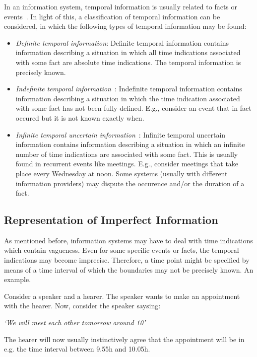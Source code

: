 In an information system, temporal information is usually related to facts or events~\cite{Chountas2000}. In light of this, a classification of temporal information can be considered, in which the following types of temporal information may be found:


\begin{itemize}
\item \emph{Definite temporal information}:
Definite temporal information contains information describing a situation in which all time indications associated with some fact are absolute time indications. The temporal information is precisely known.

\item \emph{Indefinite temporal information}~\cite{Dey1996}:
Indefinite temporal information contains information describing a situation in which the time indication associated with some fact has not been fully defined. E.g., consider an event that in fact occured but it is not known exactly when.

\item \emph{Infinite temporal uncertain information}~\cite{Kabanza1990}:
Infinite temporal uncertain information contains information describing a situation in which an infinite number of time indications are associated with some fact. This is usually found in recurrent events like meetings. E.g., consider meetings that take place every Wednesday at noon. Some systems (usually with different information providers) may dispute the occurence and/or the duration of a fact.
\end{itemize}

\subsection{\label{subsec:representation}Representation of Imperfect Information}
As mentioned before, information systems may have to deal with time indications which contain vagueness. Even for some specific events or facts, the temporal indications may become imprecise. Therefore, a time point might be specified by means of a time interval of which the boundaries may not be precisely known. An example.

\begin{example}
Consider a speaker and a hearer. The speaker wants to make an appointment with the hearer. Now, consider the speaker saysing: \\
\begin{center}
\emph{`We will meet each other tomorrow around 10'}\\
\end{center}
The hearer will now usually instinctively agree that the appointment will be in e.g. the time interval between 9.55h and 10.05h.
\end{example}

